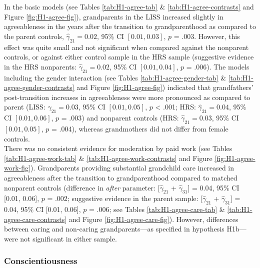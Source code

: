 \documentclass[
  english,
  man, noextraspace]{apa7}
\begin{document}
In the basic models (see Tables \ref{tab:H1-agree-tab} \& \ref{tab:H1-agree-contrasts} and Figure \ref{fig:H1-agree-fig}), grandparents in the LISS increased slightly in agreeableness in the years after the transition to grandparenthood as compared to the parent controls, \(\hat{\gamma}_{21} = 0.02\), 95\% CI \([0.01, 0.03]\), \(p\) = .003. However, this effect was quite small and not significant when compared against the nonparent controls, or against either control sample in the HRS sample (suggestive evidence in the HRS nonparents: \(\hat{\gamma}_{21} = 0.02\), 95\% CI \([0.01, 0.04]\), \(p\) = .006). The models including the gender interaction (see Tables \ref{tab:H1-agree-gender-tab} \& \ref{tab:H1-agree-gender-contrasts} and Figure \ref{fig:H1-agree-fig}) indicated that grandfathers' post-transition increases in agreeableness were more pronounced as compared to parent (LISS: \(\hat{\gamma}_{21} = 0.03\), 95\% CI \([0.01, 0.05]\), \(p\) \textless{} .001; HRS: \(\hat{\gamma}_{21} = 0.04\), 95\% CI \([0.01, 0.06]\), \(p\) = .003) and nonparent controls (HRS: \(\hat{\gamma}_{21} = 0.03\), 95\% CI \([0.01, 0.05]\), \(p\) = .004), whereas grandmothers did not differ from female controls.\\
There was no consistent evidence for moderation by paid work (see Tables \ref{tab:H1-agree-work-tab} \& \ref{tab:H1-agree-work-contrasts} and Figure \ref{fig:H1-agree-work-fig}). Grandparents providing substantial grandchild care increased in agreeableness after the transition to grandparenthood compared to matched nonparent controls (difference in \emph{after} parameter: {[}\(\hat{\gamma}_{21}\) + \(\hat{\gamma}_{31}\){]} = 0.04, 95\% CI {[}0.01, 0.06{]}, \(p\) = .002; suggestive evidence in the parent sample: {[}\(\hat{\gamma}_{21}\) + \(\hat{\gamma}_{31}\){]} = 0.04, 95\% CI {[}0.01, 0.06{]}, \(p\) = .006; see Tables \ref{tab:H1-agree-care-tab} \& \ref{tab:H1-agree-care-contrasts} and Figure \ref{fig:H1-agree-care-fig}). However, differences between caring and non-caring grandparents---as specified in hypothesis H1b---were not significant in either sample.

\hypertarget{conscientiousness}{%
\subsubsection{Conscientiousness}\label{conscientiousness}}
\end{document}
